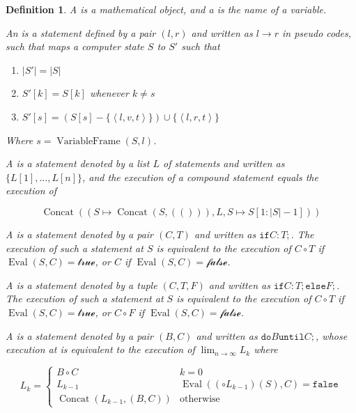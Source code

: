 \documentclass{book}
\newtheorem{definition}{Definition}
\theoremstyle{definition}\newtheorem{mechanism}{Mechanism}
\theoremstyle{remark}\newtheorem*{remark}{Remark}
\begin{document}
\begin{definition}
	A  is a mathematical object, and a  is the name of a variable.
	
	An  is a statement defined by a pair $(l, r)$ and written as $l \rightarrow r$ in pseudo codes, such that maps a computer state $S$ to $S'$ such that
	
	\begin{enumerate}
		\item $|S'| = |S|$
		\item $S'[k] = S[k]$ whenever $k \ne s$
		\item $S'[s] = \left(S[s] - \{\left<l, v, t\right>\}\right) \cup \{\left<l, r, t\right>\}$
	\end{enumerate}
	
	Where $s =  \operatorname{VariableFrame}(S, l)$.
	
	A  is a statement denoted by a list $L$ of statements and written as $\{L[1], \dots, L[n]\}$, and the execution of a compound statement equals the execution of
	
	\begin{equation*}
		\operatorname{Concat}\left((S \mapsto \operatorname{Concat}(S, (())), L, S\mapsto S[1:|S| - 1])\right)
	\end{equation*}
	
	A  is a statement denoted by a pair $(C, T)$ and written as $\mathtt{if}C: T;$. The execution of such a statement at $S$ is equivalent to the execution of $C\circ T$ if $\operatorname{Eval}(S, C) = \mathcal{true}$, or $C$ if $\operatorname{Eval}(S, C) = \mathcal{false}$.
	
	A  is a statement denoted by a tuple $(C, T, F)$ and written as $\mathtt{if}C: T; \mathtt{else} F;$. The execution of such a statement at $S$ is equivalent to the execution of $C\circ T$ if $\operatorname{Eval}(S, C) = \mathcal{true}$, or $C\circ F$ if $\operatorname{Eval}(S, C) = \mathcal{false}$.
	
	A  is a statement denoted by a pair $(B, C)$ and written as $\mathtt{do} B \mathtt{until} C;$, whose execution at is equivalent to the execution of $\lim_{n\to\infty} L_k$ where
	
	\begin{equation*}
		L_k = \begin{cases}
			B \circ C& k = 0\\
			L_{k - 1} & \operatorname{Eval}((\circ L_{k - 1})(S), C) = \mathtt{false}\\
			\operatorname{Concat}(L_{k - 1}, (B, C)) & \text{otherwise}
		\end{cases}
	\end{equation*}
	

\end{definition}
\end{document}

